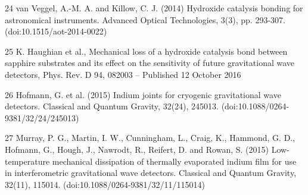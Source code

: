 24 van Veggel, A.-M. A. and Killow, C. J. (2014) Hydroxide catalysis bonding for astronomical instruments. Advanced Optical Technologies, 3(3), pp. 293-307. (doi:10.1515/aot-2014-0022)

25 K. Haughian et al., Mechanical loss of a hydroxide catalysis bond between sapphire substrates and its effect on the sensitivity of future gravitational wave detectors, Phys. Rev. D 94, 082003 – Published 12 October 2016

26 Hofmann, G. et al. (2015) Indium joints for cryogenic gravitational wave detectors. Classical and Quantum Gravity, 32(24), 245013. (doi:10.1088/0264-9381/32/24/245013)

27 Murray, P. G., Martin, I. W., Cunningham, L., Craig, K., Hammond, G. D., Hofmann, G., Hough, J., Nawrodt, R., Reifert, D. and Rowan, S. (2015) Low-temperature mechanical dissipation of thermally evaporated indium film for use in interferometric gravitational wave detectors. Classical and Quantum Gravity, 32(11), 115014. (doi:10.1088/0264-9381/32/11/115014)



